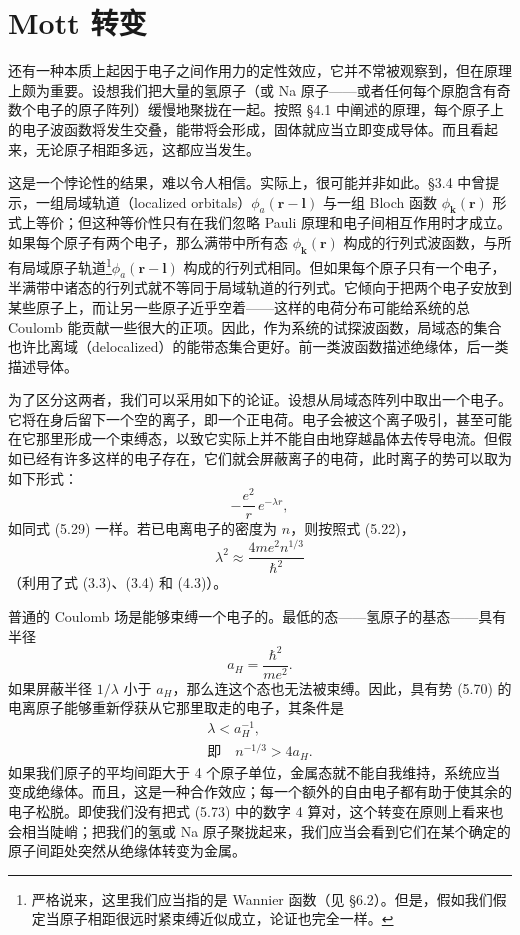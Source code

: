 \section{Mott 转变}

还有一种本质上起因于电子之间作用力的定性效应，它并不常被观察到，但在原理上颇为重要。设想我们把大量的氢原子（或 Na 原子——或者任何每个原胞含有奇数个电子的原子阵列）缓慢地聚拢在一起。按照 §4.1 中阐述的原理，每个原子上的电子波函数将发生交叠，能带将会形成，固体就应当立即变成导体。而且看起来，无论原子相距多远，这都应当发生。

这是一个悖论性的结果，难以令人相信。实际上，很可能并非如此。§3.4 中曾提示，一组局域轨道（localized orbitals）$\phi_{a}(\mathbf{r}-\mathbf{l})$ 与一组 Bloch 函数 $\phi_{\mathbf{k}}(\mathbf{r})$ 形式上等价；但这种等价性只有在我们忽略 Pauli 原理和电子间相互作用时才成立。如果每个原子有两个电子，那么满带中所有态 $\phi_{\mathbf{k}}(\mathbf{r})$ 构成的行列式波函数，与所有局域原子轨道\footnote{严格说来，这里我们应当指的是 Wannier 函数（见 §6.2）。但是，假如我们假定当原子相距很远时紧束缚近似成立，论证也完全一样。}$\phi_{a}(\mathbf{r}-\mathbf{l})$ 构成的行列式相同。但如果每个原子只有一个电子，半满带中诸态的行列式就不等同于局域轨道的行列式。它倾向于把两个电子安放到某些原子上，而让另一些原子近乎空着——这样的电荷分布可能给系统的总 Coulomb 能贡献一些很大的正项。因此，作为系统的试探波函数，局域态的集合也许比离域（delocalized）的能带态集合更好。前一类波函数描述绝缘体，后一类描述导体。

为了区分这两者，我们可以采用如下的论证。设想从局域态阵列中取出一个电子。它将在身后留下一个空的离子，即一个正电荷。电子会被这个离子吸引，甚至可能在它那里形成一个束缚态，以致它实际上并不能自由地穿越晶体去传导电流。但假如已经有许多这样的电子存在，它们就会屏蔽离子的电荷，此时离子的势可以取为如下形式：
\begin{equation*}
-\frac{e^{2}}{r}\,e^{-\lambda r}, \tag{5.70}
\end{equation*}
如同式 (5.29) 一样。若已电离电子的密度为 $n$，则按照式 (5.22)，
\begin{equation*}
\lambda^{2}\approx\frac{4me^{2}n^{1/3}}{\hbar^{2}} \tag{5.71}
\end{equation*}
（利用了式 (3.3)、(3.4) 和 (4.3)）。

普通的 Coulomb 场是能够束缚一个电子的。最低的态——氢原子的基态——具有半径
\begin{equation*}
a_{H}=\frac{\hbar^{2}}{me^{2}}. \tag{5.72}
\end{equation*}
如果屏蔽半径 $1/\lambda$ 小于 $a_{H}$，那么连这个态也无法被束缚。因此，具有势 (5.70) 的电离原子能够重新俘获从它那里取走的电子，其条件是
\begin{gather*}
\lambda<a_{H}^{-1}, \\
\text{即}\quad n^{-1/3}>4a_{H}. \tag{5.73}
\end{gather*}
如果我们原子的平均间距大于 4 个原子单位，金属态就不能自我维持，系统应当变成绝缘体。而且，这是一种合作效应；每一个额外的自由电子都有助于使其余的电子松脱。即使我们没有把式 (5.73) 中的数字 4 算对，这个转变在原则上看来也会相当陡峭；把我们的氢或 Na 原子聚拢起来，我们应当会看到它们在某个确定的原子间距处突然从绝缘体转变为金属。

